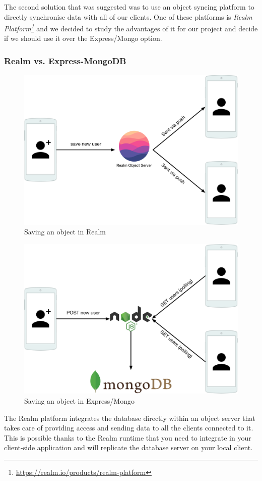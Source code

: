 \documentclass[twoside, openright,11pt,a4paper]{book}
\begin{document}
The second solution that was suggested was to use an object syncing platform to directly synchronise data with all of our clients. One of these platforms is \emph{Realm Platform\footnote{\url{https://realm.io/products/realm-platform}}} and we decided to study the advantages of it for our project and decide if we should use it over the Express/Mongo option.
\subsubsection{Realm vs. Express-MongoDB}
\begin{figure}[H]
\begin{center}
	\includegraphics[width=.8\textwidth]{assets/realm_architecture}
	\caption{Saving an object in Realm}
	\label{realm_object_saving_figure}
\end{center}
\end{figure}

\begin{figure}[H]
\begin{center}
	\includegraphics[width=.8\textwidth]{assets/expressmongo_architecture.png}
	\caption{Saving an object in Express/Mongo}
		\label{mongo_object_saving_figure}
\end{center}
\end{figure}
The Realm platform integrates the database directly within an object server that takes care of providing access and sending data to all the clients connected to it. This is possible thanks to the Realm runtime that you need to integrate in your client-side application and will replicate the database server on your local client.\\
\end{document}
